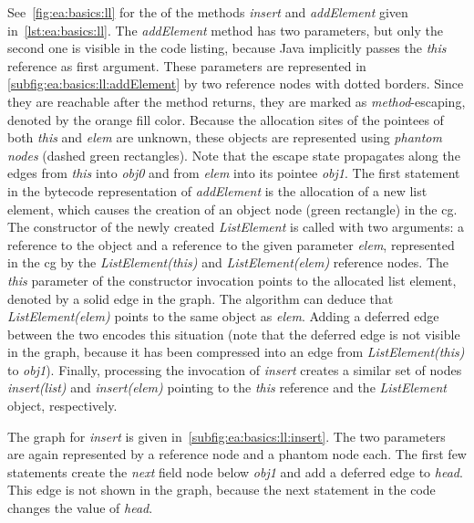 			See~\cref{fig:ea:basics:ll} for the  of the methods \emph{insert} and \emph{addElement} given
			in~\cref{lst:ea:basics:ll}. The \emph{addElement} method has two parameters, but only the second one is visible in
			the code listing, because Java implicitly passes the \emph{this} reference as first argument. These parameters are
			represented in \cref{subfig:ea:basics:ll:addElement} by two reference nodes with dotted borders. Since they are
			reachable after the method returns, they are marked as \emph{method}-escaping, denoted by the orange fill color.
			Because the allocation sites of the pointees of both \emph{this} and \emph{elem} are unknown, these objects are
			represented using \emph{phantom nodes} (dashed green rectangles). Note that the escape state propagates along the
			edges from \emph{this} into \emph{obj0} and from \emph{elem} into its pointee \emph{obj1}. The first statement in
			the bytecode representation of \emph{addElement} is the allocation of a new list element, which causes the
			creation of an object node (green rectangle) in the \gls{cg}. The constructor of the newly created
			\emph{ListElement} is called with two arguments: a reference to the object and a reference to the given parameter
			\emph{elem}, represented in the \acrlong{cg} by the \emph{ListElement(this)} and \emph{ListElement(elem)}
			reference nodes. The \emph{this} parameter of the constructor invocation points to the allocated list element,
			denoted by a solid edge in the graph. The algorithm can deduce that \emph{ListElement(elem)} points to the same
			object as \emph{elem}. Adding a deferred edge between the two encodes this situation (note that the deferred edge
			is not visible in the graph, because it has been compressed into an edge from \emph{ListElement(this)} to
			\emph{obj1}). Finally, processing the invocation of \emph{insert} creates a similar set of nodes
			\emph{insert(list)} and \emph{insert(elem)} pointing to the \emph{this} reference and the \emph{ListElement}
			object, respectively.

			The graph for \emph{insert} is given in~\cref{subfig:ea:basics:ll:insert}. The two parameters are again
			represented by a reference node and a phantom node each. The first few statements create the \emph{next} field
			node below \emph{obj1} and add a deferred edge to \emph{head}. This edge is not shown in the graph, because the
			next statement in the code changes the value of \emph{head}.


